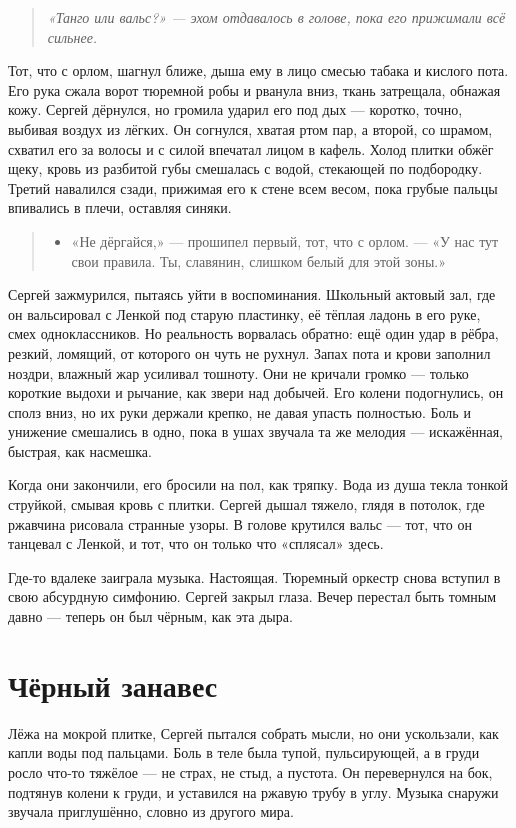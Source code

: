 \documentclass[12pt,a4paper]{book}
\newenvironment{dialogue}{\begin{quote}\itshape\begin{itemize}\item[]}{\end{itemize}\end{quote}}
\newenvironment{innerthought}{\begin{quote}\small\itshape}{\end{quote}}
\begin{document}
\begin{innerthought}
«Танго или вальс?» --- эхом отдавалось в голове, пока его прижимали всё сильнее.
\end{innerthought}

Тот, что с орлом, шагнул ближе, дыша ему в лицо смесью табака и кислого пота. Его рука сжала ворот тюремной робы и рванула вниз, ткань затрещала, обнажая кожу. Сергей дёрнулся, но громила ударил его под дых --- коротко, точно, выбивая воздух из лёгких. Он согнулся, хватая ртом пар, а второй, со шрамом, схватил его за волосы и с силой впечатал лицом в кафель. Холод плитки обжёг щеку, кровь из разбитой губы смешалась с водой, стекающей по подбородку. Третий навалился сзади, прижимая его к стене всем весом, пока грубые пальцы впивались в плечи, оставляя синяки.

\begin{dialogue}
«Не дёргайся,» --- прошипел первый, тот, что с орлом. --- «У нас тут свои правила. Ты, славянин, слишком белый для этой зоны.»
\end{dialogue}

Сергей зажмурился, пытаясь уйти в воспоминания. Школьный актовый зал, где он вальсировал с Ленкой под старую пластинку, её тёплая ладонь в его руке, смех одноклассников. Но реальность ворвалась обратно: ещё один удар в рёбра, резкий, ломящий, от которого он чуть не рухнул. Запах пота и крови заполнил ноздри, влажный жар усиливал тошноту. Они не кричали громко --- только короткие выдохи и рычание, как звери над добычей. Его колени подогнулись, он сполз вниз, но их руки держали крепко, не давая упасть полностью. Боль и унижение смешались в одно, пока в ушах звучала та же мелодия --- искажённая, быстрая, как насмешка.

Когда они закончили, его бросили на пол, как тряпку. Вода из душа текла тонкой струйкой, смывая кровь с плитки. Сергей дышал тяжело, глядя в потолок, где ржавчина рисовала странные узоры. В голове крутился вальс --- тот, что он танцевал с Ленкой, и тот, что он только что «сплясал» здесь.

Где-то вдалеке заиграла музыка. Настоящая. Тюремный оркестр снова вступил в свою абсурдную симфонию. Сергей закрыл глаза. Вечер перестал быть томным давно --- теперь он был чёрным, как эта дыра.

\section{Чёрный занавес}

Лёжа на мокрой плитке, Сергей пытался собрать мысли, но они ускользали, как капли воды под пальцами. Боль в теле была тупой, пульсирующей, а в груди росло что-то тяжёлое --- не страх, не стыд, а пустота. Он перевернулся на бок, подтянув колени к груди, и уставился на ржавую трубу в углу. Музыка снаружи звучала приглушённо, словно из другого мира.
\end{document}
